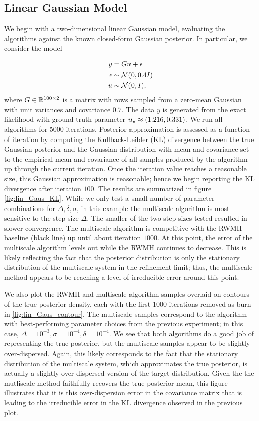 \documentclass[12pt]{article}
\begin{document}
\subsection{Linear Gaussian Model}
We begin with a two-dimensional linear Gaussian model, evaluating the algorithms against the known closed-form Gaussian posterior. In particular, we consider the model 

\begin{align}
y &= G u + \epsilon \\
\epsilon &\sim \mathcal{N}(0, 0.4I) \nonumber \\
u &\sim \mathcal{N}(0, I), \nonumber
\end{align}
where $G \in \mathbb{R}^{100 \times 2}$ is a matrix with rows sampled from a zero-mean Gaussian with unit variances and covariance $0.7$. 
The data $y$ is generated from the exact likelihood with ground-truth parameter $u_\star \approx (1.216, 0.331)$. We run all 
algorithms for 5000 iterations. Posterior approximation is assessed as a function of iteration by computing the Kullback-Leibler (KL) divergence 
between the true Gaussian posterior and the Gaussian distribution with mean and covariance set to the empirical mean and covariance 
of all samples produced by the algorithm up through the current iteration. Once the iteration value reaches a reasonable size, this Gaussian 
approximation is reasonable; hence we begin reporting the KL divergence after iteration $100$. 
The results are summarized in figure \ref{fig:lin_Gaus_KL}. While we only test a small number of 
parameter combinations for $\Delta, \delta, \sigma$, in this example the multiscale algorithm is most sensitive to the step size $\Delta$. The smaller 
of the two step sizes tested resulted in slower convergence. The multiscale algorithm is competitive with the RWMH baseline (black line) up until 
about iteration $1000$. At this point, the error of the multiscale algorithm levels out while the RWMH continues to decrease. This is likely reflecting the 
fact that the posterior distribution is only the stationary distribution of the multiscale system in the refinement limit; thus, the multiscale method appears 
to be reaching a level of irreducible error around this point. 

We also plot the RWMH and multiscale algorithm samples overlaid on contours of the true posterior density, each with the first 1000 iterations 
removed as burn-in \ref{fig:lin_Gaus_contour}. The multiscale samples correspond to the algorithm with best-performing parameter choices from 
the previous experiment; in this case, $\Delta=10^{-3}, \sigma=10^{-4}, \delta=10^{-4}$. We see that both algorithms do a good job  of representing 
the true posterior, but the multiscale samples appear to be slightly over-dispersed. Again, this likely corresponds to the fact that the stationary distribution 
of the multiscale system, which approximates the true posterior, is actually a slightly over-dispersed version of the target distribution. Given the the mutliscale 
method faithfully recovers the true posterior mean, this figure illustrates that it is this over-dispersion error in the covariance matrix that is leading to the 
irreducible error in the KL divergence observed in the previous plot. 
\end{document}
